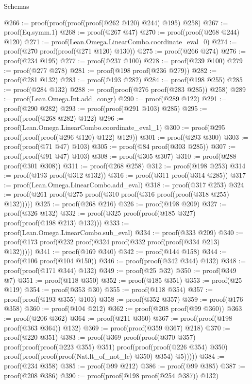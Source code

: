\begin{lexlean}{Schemas}
\begin{coremodule}
@266 := proof(proof(proof(proof(@262 @120) @244) @195) @258)
@267 := proof(Eq.symm.{1})
@268 := proof(@267 @47)
@270 := proof(proof(@268 @244) @120)
@271 := proof(Lean.Omega.LinearCombo.coordinate_eval_0)
@274 := proof(@270 proof(proof(@271 @120) @130))
@275 := proof(@266 @274)
@276 := proof(@234 @195)
@277 := proof(@237 @100)
@278 := proof(@239 @100)
@279 := proof(@277 @278)
@281 := proof(@198 proof(@236 @279))
@282 := proof(@281 @132)
@283 := proof(@193 @282)
@284 := proof(@198 @255)
@285 := proof(@284 @132)
@288 := proof(proof(@276 proof(@283 @285)) @258)
@289 := proof(Lean.Omega.Int.add_congr)
@290 := proof(@289 @122)
@291 := proof(@290 @282)
@293 := proof(proof(@291 @103) @285)
@295 := proof(proof(@268 @282) @122)
@296 := proof(Lean.Omega.LinearCombo.coordinate_eval_1)
@300 := proof(@295 proof(proof(proof(@296 @120) @122) @129))
@301 := proof(@293 @300)
@303 := proof(proof(@71 @47) @103)
@305 := proof(@84 proof(@303 @285))
@307 := proof(proof(@91 @47) @103)
@308 := proof(@305 @307)
@310 := proof(@288 proof(@301 @308))
@311 := proof(@268 @258)
@312 := proof(@198 @253)
@314 := proof(@193 proof(@312 @132))
@316 := proof(@311 proof(@314 @285))
@317 := proof(Lean.Omega.LinearCombo.add_eval)
@318 := proof(@317 @253)
@324 := proof(@261 proof(@275 proof(@310 proof(@316 proof(proof(@318 @255) @132)))))
@325 := proof(@268 @216)
@326 := proof(@198 @209)
@327 := proof(@326 @132)
@332 := proof(@325 proof(proof(@185 @327) proof(proof(@198 @213) @132)))
@333 := proof(Lean.Omega.LinearCombo.sub_eval)
@334 := proof(@333 @209)
@340 := proof(@173 proof(@232 proof(@324 proof(@332 proof(proof(@334 @213) @132)))))
@341 := proof(@169 @340)
@342 := proof(@144 @158)
@344 := proof(@106 proof(@104 @150))
@346 := proof(proof(@342 @344) @132)
@348 := proof(proof(@171 @344) @132)
@349 := proof(@25 @32)
@350 := proof(@349 @7)
@351 := proof(@118 @350)
@352 := proof(@185 @351)
@353 := proof(@25 @119)
@354 := proof(@353 @30)
@355 := proof(@118 @354)
@357 := proof(proof(@193 @355) @103)
@358 := proof(@352 @357)
@359 := proof(@176 @358)
@360 := proof(@104 @212)
@362 := proof(@208 proof(@99 @360))
@363 := proof(@206 @362)
@364 := proof(@211 @360)
@367 := proof(proof(@198 proof(@363 @364)) @132)
@369 := proof(proof(@359 @367) @218)
@370 := proof(@220 @351)
@383 := proof(@369
      proof(proof(@370 @357)
          proof(proof(proof(@223 @355) @351)
              proof(proof(proof(@226 @354) @350)
                  proof(proof(proof(proof(Nat.lt_of_not_le) @350) @354) @5)))))
@384 := proof(@234 @358)
@385 := proof(@99 @212)
@386 := proof(@99 @385)
@387 := proof(@208 @386)
@390 := proof(proof(@198 proof(@254 @387)) @132)

\end{coremodule}
\end{lexlean}
